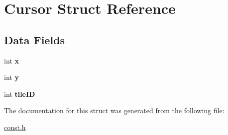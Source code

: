 \hypertarget{struct_cursor}{\section{Cursor Struct Reference}
\label{struct_cursor}
}
\subsection*{Data Fields}
\begin{DoxyCompactItemize}
\item 
\hypertarget{struct_cursor_a6150e0515f7202e2fb518f7206ed97dc}{int {\bfseries x}}\label{struct_cursor_a6150e0515f7202e2fb518f7206ed97dc}

\item 
\hypertarget{struct_cursor_a0a2f84ed7838f07779ae24c5a9086d33}{int {\bfseries y}}\label{struct_cursor_a0a2f84ed7838f07779ae24c5a9086d33}

\item 
\hypertarget{struct_cursor_aeeda4ec0cbb14f14167705f44156e13e}{int {\bfseries tile\-I\-D}}\label{struct_cursor_aeeda4ec0cbb14f14167705f44156e13e}

\end{DoxyCompactItemize}


The documentation for this struct was generated from the following file\-:\begin{DoxyCompactItemize}
\item 
\hyperlink{const_8h}{const.\-h}\end{DoxyCompactItemize}
